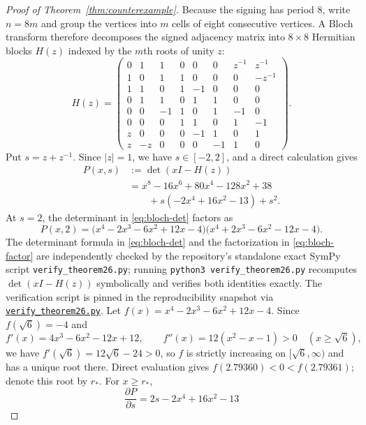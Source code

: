 \documentclass[11pt]{article}
\theoremstyle{remark}
\begin{document}
\begin{proof}[Proof of Theorem~\ref{thm:counterexample}]
Because the signing has period $8$, write $n=8m$ and group the vertices
into $m$ cells of eight consecutive vertices. A Bloch transform
therefore decomposes the signed adjacency matrix into $8\times8$
Hermitian blocks $H(z)$ indexed by the $m$th roots of unity $z$:
\[
H(z)=
\begin{pmatrix}
0&1&1&0&0&0&z^{-1}&z^{-1}\\
1&0&1&1&0&0&0&-z^{-1}\\
1&1&0&1&-1&0&0&0\\
0&1&1&0&1&1&0&0\\
0&0&-1&1&0&1&-1&0\\
0&0&0&1&1&0&1&-1\\
z&0&0&0&-1&1&0&1\\
z&-z&0&0&0&-1&1&0
\end{pmatrix}.
\]
Put $s=z+z^{-1}$. Since $|z|=1$, we have $s\in[-2,2]$, and a direct
calculation gives
\begin{equation}\label{eq:bloch-det}
\begin{aligned}
P(x,s)&:=\det(xI-H(z))\\
&=x^8-16x^6+80x^4-128x^2+38\\
&\qquad+s(-2x^4+16x^2-13)+s^2.
\end{aligned}
\end{equation}
At $s=2$, the determinant in \eqref{eq:bloch-det} factors as
\begin{equation}\label{eq:bloch-factor}
P(x,2)=
\bigl(x^4-2x^3-6x^2+12x-4\bigr)
\bigl(x^4+2x^3-6x^2-12x-4\bigr).
\end{equation}
The determinant formula in \eqref{eq:bloch-det} and the factorization in \eqref{eq:bloch-factor} are independently
checked by the repository's standalone exact SymPy script \texttt{verify\_theorem26.py}; running
\texttt{python3 verify\_theorem26.py} recomputes \(\det(xI-H(z))\) symbolically and verifies both identities exactly.
The verification script is pinned in the reproducibility snapshot via
\href{https://github.com/Vaibhavs25/bilu-linial-parity/blob/b37002b020edd5d26065a0ee6ee7cff85cf7814c/verify_theorem26.py}{\texttt{verify\_theorem26.py}}.
Let $f(x)=x^4-2x^3-6x^2+12x-4$. Since
$f(\sqrt6)=-4$ and
\[
f'(x)=4x^3-6x^2-12x+12,
\qquad
f''(x)=12(x^2-x-1)>0\quad(x\ge\sqrt6),
\]
we have $f'(\sqrt6)=12\sqrt6-24>0$, so $f$ is strictly increasing on
$[\sqrt6,\infty)$ and has a unique root there. Direct evaluation gives
$f(2.79360)<0<f(2.79361)$; denote this root by $r_*$. For $x\ge r_*$,
\[
\frac{\partial P}{\partial s}=2s-2x^4+16x^2-13
\]
\end{proof}
\end{document}
